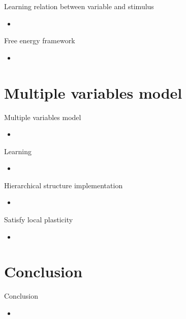 \documentclass[aspectratio=43]{beamer}
\begin{document}
\begin{frame}{Learning relation between variable and stimulus}
  \begin{itemize}
    \item %
  \end{itemize}
\end{frame}

\begin{frame}{Free energy framework}
  \begin{itemize}
    \item %
  \end{itemize}
\end{frame}



\section{Multiple variables model}
\begin{frame}{Multiple variables model}
  \begin{itemize}
    \item %
  \end{itemize}
\end{frame}

\begin{frame}{Learning}
  \begin{itemize}
    \item %
  \end{itemize}
\end{frame}

\begin{frame}{Hierarchical structure implementation}
  \begin{itemize}
    \item %
  \end{itemize}
\end{frame}

\begin{frame}{Satisfy local plasticity}
  \begin{itemize}
    \item %
  \end{itemize}
\end{frame}




\section{Conclusion}
\begin{frame}{Conclusion}
  \begin{itemize}
    \item %
  \end{itemize}
\end{frame}
\end{document}
